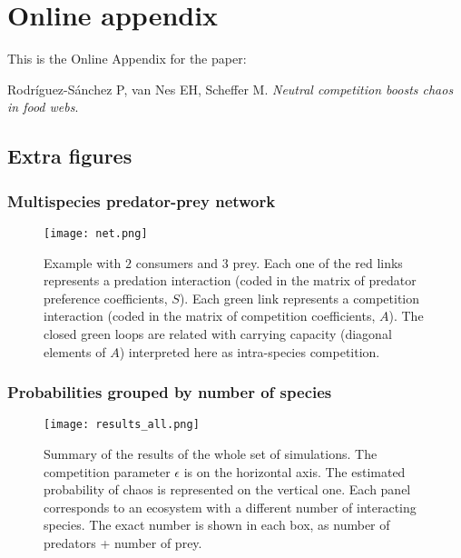 \appendix
\setcounter{equation}{0}
\setcounter{figure}{0}
\renewcommand{\theequation}{A.\arabic{equation}}
\renewcommand\thefigure{A.\arabic{figure}}

\section{Online appendix}
\label{sec:Appendix}

This is the Online Appendix for the paper:

\begin{center}
Rodríguez-Sánchez P, van Nes EH, Scheffer M. \textit{Neutral competition boosts chaos in food webs}.
\end{center}

\subsection{Extra figures}
\label{subsec:ExtraFigures}

\subsubsection{Multispecies predator-prey network}
\label{subsubsec:MultispeciesPPNetwork}
\begin{figure}[H]
	\begin{center}
		\texttt{[image: net.png]}
	\end{center}
	\caption{Example with $2$ consumers and $3$ prey. Each one of the red links represents a predation interaction (coded in the matrix of predator preference coefficients, $ S $). Each green link represents a competition interaction (coded in the matrix of competition coefficients, $ A $). The closed green loops are related with carrying capacity (diagonal elements of $ A $) interpreted here as intra-species competition.}
	\label{fig:Network}
\end{figure}

\subsubsection{Probabilities grouped by number of species}
\label{subsubsec:AllProbabilities}
\begin{figure}[H]
	\begin{center}
		\texttt{[image: results\_all.png]}
	\end{center}
	\caption{Summary of the results of the whole set of simulations. The competition parameter $\epsilon$ is on the horizontal axis. The estimated probability of chaos is represented on the vertical one. Each panel corresponds to an ecosystem with a different number of interacting species. The exact number is shown in each box, as number of predators + number of prey.}
	\label{fig:AllProbabilities}
\end{figure}

